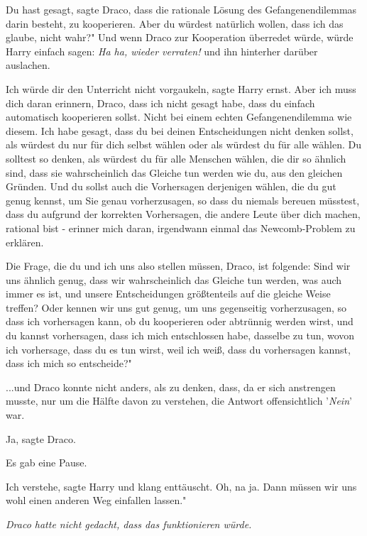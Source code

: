 \glqq Du hast gesagt\grqq{}, sagte Draco, \glqq dass die rationale Lösung des
Gefangenendilemmas darin besteht, zu kooperieren. Aber du würdest natürlich
wollen, dass ich das glaube, nicht wahr?" Und wenn Draco zur Kooperation
überredet würde, würde Harry einfach sagen: \emph{ \glqq Ha ha, wieder
verraten!\grqq{}} und ihn hinterher darüber auslachen.

\glqq Ich würde dir den Unterricht nicht vorgaukeln\grqq{}, sagte Harry ernst.
\glqq Aber ich muss dich daran erinnern, Draco, dass ich nicht gesagt habe, dass
du einfach automatisch kooperieren sollst. Nicht bei einem echten
Gefangenendilemma wie diesem. Ich habe gesagt, dass du bei deinen Entscheidungen
nicht denken sollst, als würdest du nur für dich selbst wählen oder als würdest
du für alle wählen. Du solltest so denken, als würdest du für alle Menschen
wählen, die dir so ähnlich sind, dass sie wahrscheinlich das Gleiche tun werden
wie du, aus den gleichen Gründen. Und du sollst auch die Vorhersagen derjenigen
wählen, die du gut genug kennst, um Sie genau vorherzusagen, so dass du niemals
bereuen müsstest, dass du aufgrund der korrekten Vorhersagen, die andere Leute
über dich machen, rational bist - erinner mich daran, irgendwann einmal das
Newcomb-Problem zu erklären.

Die Frage, die du und ich uns also stellen müssen, Draco, ist folgende: Sind wir
uns ähnlich genug, dass wir wahrscheinlich das Gleiche tun werden, was auch
immer es ist, und unsere Entscheidungen größtenteils auf die gleiche Weise
treffen? Oder kennen wir uns gut genug, um uns gegenseitig vorherzusagen, so
dass ich vorhersagen kann, ob du kooperieren oder abtrünnig werden wirst, und du
kannst vorhersagen, dass ich mich entschlossen habe, dasselbe zu tun, wovon ich
vorhersage, dass du es tun wirst, weil ich weiß, dass du vorhersagen kannst,
dass ich mich so entscheide?"

...und Draco konnte nicht anders, als zu denken, dass, da er sich anstrengen
musste, nur um die Hälfte davon zu verstehen, die Antwort offensichtlich
'\emph{Nein}' war.

\glqq Ja\grqq{}, sagte Draco.

Es gab eine Pause.

\glqq Ich verstehe\grqq{}, sagte Harry und klang enttäuscht. \glqq Oh, na ja.
Dann müssen wir uns wohl einen anderen Weg einfallen lassen."

\emph{Draco hatte nicht gedacht, dass das funktionieren würde.}

